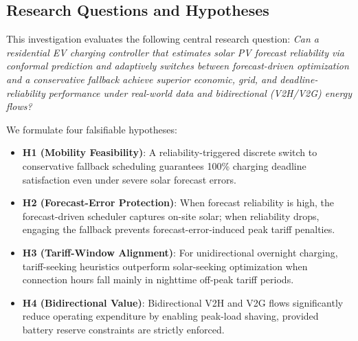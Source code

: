 \documentclass[conference]{IEEEtran}
\begin{document}
\subsection{Research Questions and Hypotheses}
This investigation evaluates the following central research question:
\textit{Can a residential EV charging controller that estimates solar PV forecast reliability via conformal prediction and adaptively switches between forecast-driven optimization and a conservative fallback achieve superior economic, grid, and deadline-reliability performance under real-world data and bidirectional (V2H/V2G) energy flows?}

We formulate four falsifiable hypotheses:
\begin{itemize}
    \item \textbf{H1 (Mobility Feasibility)}: A reliability-triggered discrete switch to conservative fallback scheduling guarantees 100\% charging deadline satisfaction even under severe solar forecast errors.
    \item \textbf{H2 (Forecast-Error Protection)}: When forecast reliability is high, the forecast-driven scheduler captures on-site solar; when reliability drops, engaging the fallback prevents forecast-error-induced peak tariff penalties.
    \item \textbf{H3 (Tariff-Window Alignment)}: For unidirectional overnight charging, tariff-seeking heuristics outperform solar-seeking optimization when connection hours fall mainly in nighttime off-peak tariff periods.
    \item \textbf{H4 (Bidirectional Value)}: Bidirectional V2H and V2G flows significantly reduce operating expenditure by enabling peak-load shaving, provided battery reserve constraints are strictly enforced.
\end{itemize}
\end{document}
